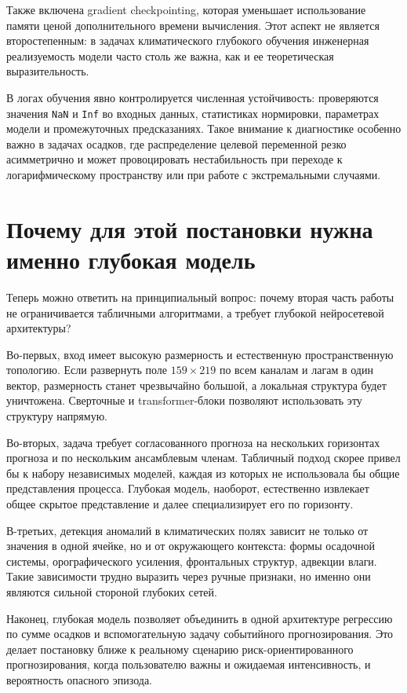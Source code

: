 Также включена gradient checkpointing, которая уменьшает использование памяти ценой дополнительного времени вычисления. Этот аспект не является второстепенным: в задачах климатического глубокого обучения инженерная реализуемость модели часто столь же важна, как и ее теоретическая выразительность.

В логах обучения явно контролируется численная устойчивость: проверяются значения \texttt{NaN} и \texttt{Inf} во входных данных, статистиках нормировки, параметрах модели и промежуточных предсказаниях. Такое внимание к диагностике особенно важно в задачах осадков, где распределение целевой переменной резко асимметрично и может провоцировать нестабильность при переходе к логарифмическому пространству или при работе с экстремальными случаями.

\section{Почему для этой постановки нужна именно глубокая модель}

Теперь можно ответить на принципиальный вопрос: почему вторая часть работы не ограничивается табличными алгоритмами, а требует глубокой нейросетевой архитектуры?

Во-первых, вход имеет высокую размерность и естественную пространственную топологию. Если развернуть поле \(159\times219\) по всем каналам и лагам в один вектор, размерность станет чрезвычайно большой, а локальная структура будет уничтожена. Сверточные и transformer-блоки позволяют использовать эту структуру напрямую.

Во-вторых, задача требует согласованного прогноза на нескольких горизонтах прогноза и по нескольким ансамблевым членам. Табличный подход скорее привел бы к набору независимых моделей, каждая из которых не использовала бы общие представления процесса. Глубокая модель, наоборот, естественно извлекает общее скрытое представление и далее специализирует его по горизонту.

В-третьих, детекция аномалий в климатических полях зависит не только от значения в одной ячейке, но и от окружающего контекста: формы осадочной системы, орографического усиления, фронтальных структур, адвекции влаги. Такие зависимости трудно выразить через ручные признаки, но именно они являются сильной стороной глубоких сетей.

Наконец, глубокая модель позволяет объединить в одной архитектуре регрессию по сумме осадков и вспомогательную задачу событийного прогнозирования. Это делает постановку ближе к реальному сценарию риск-ориентированного прогнозирования, когда пользователю важны и ожидаемая интенсивность, и вероятность опасного эпизода.

